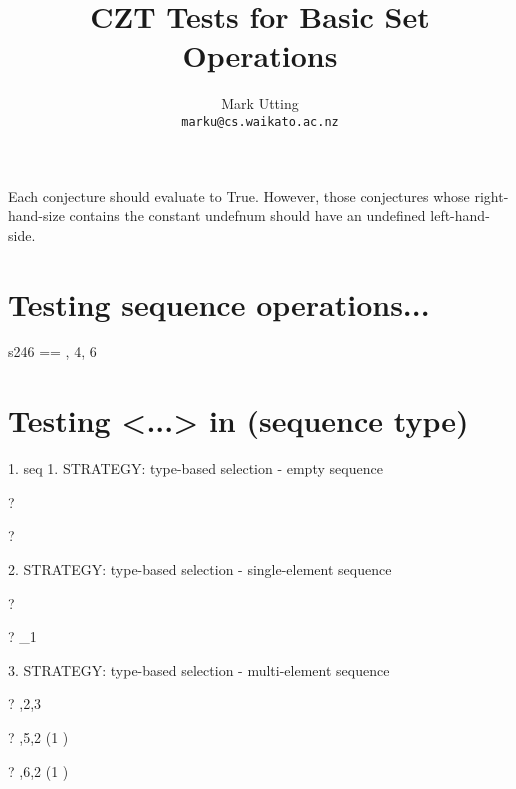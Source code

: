 \documentclass{article}
\title{CZT Tests for Basic Set Operations}
\author{Mark Utting \\ \texttt{marku@cs.waikato.ac.nz}}
\begin{document}
\maketitle

Each conjecture should evaluate to True.
However, those conjectures whose right-hand-size contains
the constant undefnum should have an undefined left-hand-side.


\section{Testing sequence operations...}

\begin{zed}
   s246 == , 4, 6 \rangle
\end{zed}

\section{Testing <...> in (sequence type)}
 1. seq
     1. STRATEGY: type-based selection - empty sequence 
\begin{zed} \vdash? \langle\rangle \in \seq \nat \end{zed}
\begin{zed} \vdash? \langle\rangle \in \seq \langle\rangle \end{zed}
     2. STRATEGY: type-based selection - single-element sequence
\begin{zed} \vdash?  \rangle \in \seq \nat \end{zed}
\begin{zed} \vdash?  \rangle \notin \seq \nat_1 \end{zed}
     3. STRATEGY: type-based selection - multi-element sequence
\begin{zed} \vdash? ,2,3 \rangle \in \seq \nat \end{zed}
\begin{zed} \vdash? ,5,2 \rangle \in \seq (1 ) \end{zed}
\begin{zed} \vdash? ,6,2 \rangle \notin \seq (1 ) \end{zed}
\end{document}
